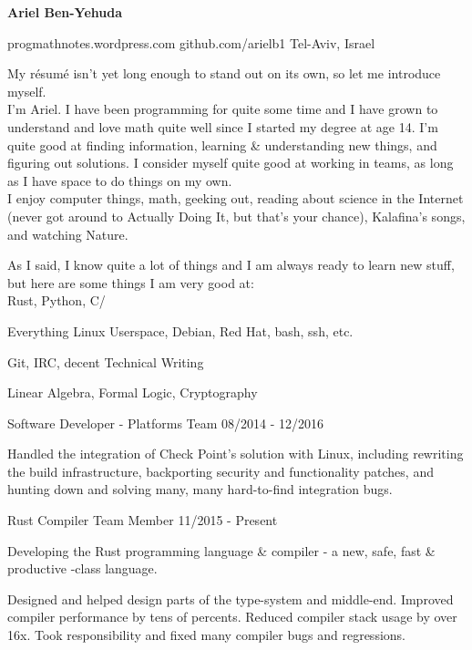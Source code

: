 \documentclass[11pt]{article} %
\begin{document}
\centerline{{\Huge \bf Ariel Ben-Yehuda}}
\bigskip

        {progmathnotes.wordpress.com}
        {github.com/arielb1}
        {Tel-Aviv, Israel}


My résumé isn't yet long enough to stand out on its own, so let me introduce myself. \\

I'm Ariel. I have been programming for quite some time and I have grown to understand and love math quite well since I started my degree at age 14. I'm quite good at finding information, learning \& understanding new things, and figuring out solutions. I consider myself quite good at working in teams, as long as I have space to do things on my own. \\

I enjoy computer things, math, geeking out, reading about science in the Internet (never got around to Actually Doing It, but that's your chance), Kalafina's songs, and watching Nature. \\


As I said, I know quite a lot of things and I am always ready to learn new stuff, but here are some things I am very good at: \\

      {Rust, Python, C/\CPP}

      {Everything Linux Userspace, Debian, Red Hat, bash, ssh, etc.}

      {Git, IRC, decent Technical Writing}

      {Linear Algebra, Formal Logic, Cryptography}


\begin{description}
\squish
{}
           {Software Developer - Platforms Team}
           {08/2014 - 12/2016}

Handled the integration of Check Point's solution with Linux, including rewriting the build infrastructure, backporting security and functionality patches, and hunting down and solving many, many hard-to-find integration bugs.

           {Rust Compiler Team Member}
           {11/2015 - Present}

Developing the Rust programming language \& compiler - a new, safe, fast \& productive \CPP-class language.

Designed and helped design parts of the type-system and middle-end. Improved compiler performance by tens of percents. Reduced compiler stack usage by over 16x. Took responsibility and fixed many compiler bugs and regressions.

\end{description}
\end{document}
